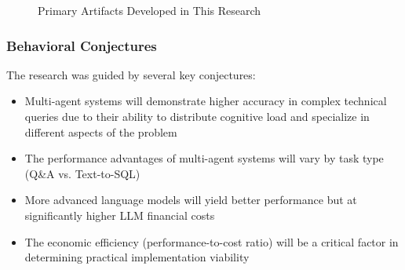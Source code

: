         \begin{figure}[h]
        \centering
        \begin{minipage}{0.45\textwidth}
            \centering
        \end{minipage}
        \hfill
        \begin{minipage}{0.45\textwidth}
            \centering
        \end{minipage}
        \caption{Primary Artifacts Developed in This Research}
        \label{fig:artifacts}
        \end{figure}
        
        
        \subsubsection{Behavioral Conjectures}
        
        The research was guided by several key conjectures:
        
        \begin{tcolorbox}[colback=gray!10, colframe=gray!40, title=Key Research Conjectures]
            \begin{itemize}
            \item Multi-agent systems will demonstrate higher accuracy in complex technical queries due to their ability to distribute cognitive load and specialize in different aspects of the problem
            \item The performance advantages of multi-agent systems will vary by task type (Q\&A vs. Text-to-SQL)
            \item More advanced language models will yield better performance but at significantly higher LLM financial costs
            \item The economic efficiency (performance-to-cost ratio) will be a critical factor in determining practical implementation viability
            \end{itemize}
        \end{tcolorbox}
        
